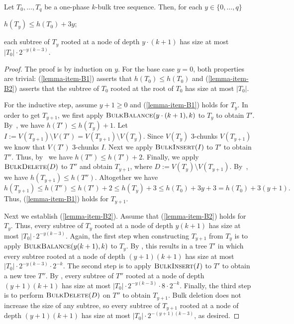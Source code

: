 \documentclass[kpfonts]{patmorin}
\let\le\leqslant
\let\ge\geqslant
\newcommand{\itemref}[1]{(\ref{#1})}
\begin{document}
\begin{lem}
Let $T_0,\ldots,T_{q}$ be a one-phase $k$-bulk tree sequence.
Then, for each $y\in\{0,\ldots,q\}$
\begin{compactenum}[(i)]
\item $h(T_y)\le h(T_0) + 3y$;\label{lemma-item-B1}
\item each subtree of $T_y$ rooted at a node of depth $y\cdot (k+1)$ has size at most
$|T_0|\cdot2^{-y(k-3)}$.\label{lemma-item-B2}
\end{compactenum}
\end{lem}
\begin{proof}
The proof is by induction on $y$.  For the base case $y=0$, both properties are trivial: \itemref{lemma-item-B1} asserts that $h(T_0)\le h(T_0)$ and \itemref{lemma-item-B2} asserts that the subtree of $T_0$ rooted at the root of $T_0$ has size at most $|T_0|$.

  For the inductive step, assume $y+1\ge 0$ and \itemref{lemma-item-B1} holds for $T_{y}$.
  In order to get $T_{y+1}$, we first apply $\textsc{BulkBalance}(y\cdot (k+1),k)$ to $T_y$ to obtain $T'$.
  By~, we have $h(T') \le h(T_y)+1$.
  Let $I:=V(T_{y+1})\setminus V(T') = V(T_{y+1})\setminus V(T_y)$.
  Since $V(T_y)$ $3$-chunks $V(T_{y+1})$ we know that $V(T')$ $3$-chunks $I$.
  Next we apply $\textsc{BulkInsert}(I)$ to $T'$ to obtain $T''$.
  Thus, by~ we have $h(T'') \le h(T')+2$.
  Finally, we apply $\textsc{BulkDelete}(D)$ to $T''$ and obtain $T_{y+1}$, where $D:=V(T_{y})\setminus V(T_{y+1})$.
  By~, we have $h(T_{y+1}) \le h(T'')$.
  Altogether we have
  \[
  h(T_{y+1}) \le h(T'') \le h(T') +2 \le h(T_y) +3 \le h(T_0) + 3y +3 = h(T_0) + 3(y+1).
  \]
  Thus, \itemref{lemma-item-B1} holds for $T_{y+1}$.

    Next we establish \itemref{lemma-item-B2}.
    Assume that \itemref{lemma-item-B2} holds for $T_{y}$.
    Thus, every subtree of $T_{y}$ rooted at a node of depth $y(k+1)$ has size at most $|T_{0}|\cdot2^{-y(k-3)}$.
    Again, the first step when constructing $T_{y+1}$ from $T_{y}$ is to apply $\textsc{BulkBalance}(y(k+1),k)$ to $T_{y}$.  By , this results in a tree $T'$ in which every subtree rooted at a node of depth $(y+1)(k+1)$ has size at most $|T_{0}|\cdot 2^{-y(k-3)}\cdot 2^{-k}$.  The second step is to apply $\textsc{BulkInsert}(I)$ to $T'$ to obtain a new tree $T''$.
    By , every subtree of $T''$ rooted at a node of depth $(y+1)(k+1)$ has size at most $|T_{0}|\cdot 2^{-y(k-3)}\cdot 8 \cdot 2^{-k}$.  Finally, the third step is to perform $\textsc{BulkDelete}(D)$ on $T''$ to obtain $T_{y+1}$.  Bulk deletion does not increase the size of any subtree, so every subtree of $T_{y+1}$ rooted at a node of depth $(y+1)(k+1)$ has size at most $|T_{0}|\cdot 2^{-(y+1)(k-3)}$, as desired.
\end{proof}
\end{document}
